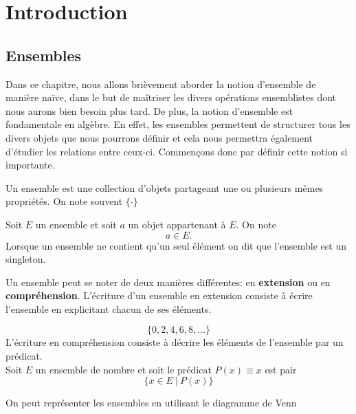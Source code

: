 
\chapter{Introduction}
\section{Ensembles}
Dans ce chapitre, nous allons brièvement aborder la notion d'ensemble de manière naïve, dans le but de maîtriser les divers opérations ensemblistes dont nous aurons bien besoin plus tard. De plus, la notion d'ensemble est fondamentale en algèbre. En effet, les ensembles permettent de structurer tous les divers objets que nous pourrons définir et cela nous permettra également d'étudier les relations entre ceux-ci. Commençons donc par définir cette notion si importante.


\begin{definition}
        Un ensemble est une collection d'objets partageant une ou plusieurs mêmes propriétés. On note souvent $\{\cdot\}$
\end{definition}

\begin{notation}
    Soit $E$ un ensemble et soit $a$ un objet appartenant à $E$. On note 
\[
a\in E.
\]
Lorsque un ensemble ne contient qu'un seul élément on dit que l'ensemble est un singleton.
\end{notation}


Un ensemble peut se noter de deux manières différentes: en \textbf{extension} ou en \textbf{compréhension}. L'écriture d'un ensemble en extension consiste à écrire l'ensemble en explicitant chacun de ses éléments.\\
\begin{exemple}
    \[
\{0,2,4,6,8,...\}
\]
L'écriture en compréhension consiste à décrire les éléments de l'ensemble par un prédicat.\\
Soit $E$ un ensemble de nombre et soit le prédicat $P(x)\equiv x$ est pair
\[
\{x\in E \:|\:P(x)\}
\]
\end{exemple}

On peut représenter les ensembles en utilisant le diagramme de Venn\\

\begin{center}
\end{center}
